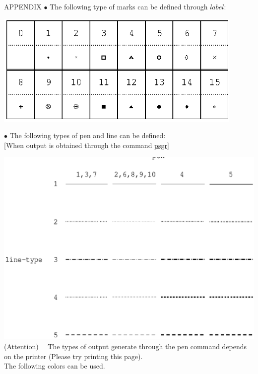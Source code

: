 \begin{qsection}{APPENDIX}
\hypertarget{lmark}{}
{\large \hspace{-1.5ex}$\bullet$
The following type of marks can be defined through $label$:}

\begin{center}
\leavevmode
\includegraphics[width=12cm]{fig/mark.eps} \\
\end{center}

\hypertarget{pen-line}{}
{\large \hspace{-1.5ex}$\bullet$
The following types of pen and line can be defined:}\\
\hspace{3mm}[When output is obtained through the command \hyperlink{psgr}{psgr}]

\leavevmode
\includegraphics{fig/pen-line.eps} \\

(Attention)~~ The types of output generate through the pen command
depends on the printer (Please try printing this page).
\\
\hypertarget{pen-color}{}
The following colors can be used.\\


\end{qsection}
